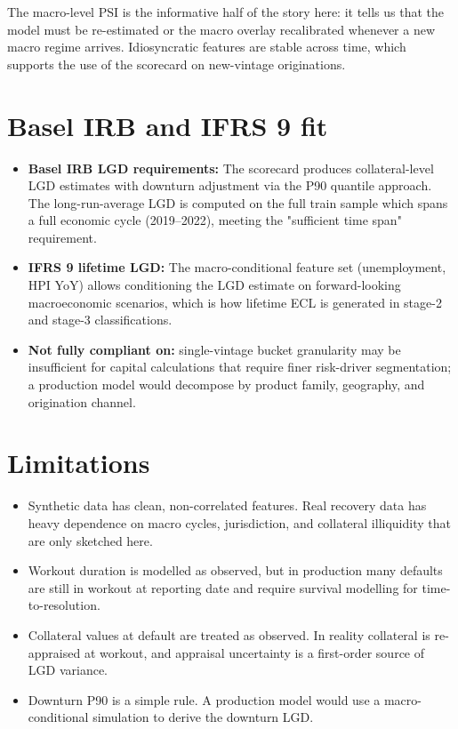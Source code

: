 \documentclass[a4paper,11pt]{article}
\begin{document}
The macro-level PSI is the informative half of the story here: it
tells us that the model must be re-estimated or the macro overlay
recalibrated whenever a new macro regime arrives. Idiosyncratic
features are stable across time, which supports the use of the
scorecard on new-vintage originations.

\section{Basel IRB and IFRS 9 fit}

\begin{itemize}
  \item \textbf{Basel IRB LGD requirements:} The scorecard produces
        collateral-level LGD estimates with downturn adjustment via
        the P90 quantile approach. The long-run-average LGD is
        computed on the full train sample which spans a full economic
        cycle (2019--2022), meeting the "sufficient time span"
        requirement.
  \item \textbf{IFRS 9 lifetime LGD:} The macro-conditional feature
        set (unemployment, HPI YoY) allows conditioning the LGD
        estimate on forward-looking macroeconomic scenarios, which is
        how lifetime ECL is generated in stage-2 and stage-3
        classifications.
  \item \textbf{Not fully compliant on:} single-vintage bucket
        granularity may be insufficient for capital calculations that
        require finer risk-driver segmentation; a production model
        would decompose by product family, geography, and origination
        channel.
\end{itemize}

\section{Limitations}

\begin{itemize}
  \item Synthetic data has clean, non-correlated features. Real
        recovery data has heavy dependence on macro cycles, jurisdiction,
        and collateral illiquidity that are only sketched here.
  \item Workout duration is modelled as observed, but in production
        many defaults are still in workout at reporting date and
        require survival modelling for time-to-resolution.
  \item Collateral values at default are treated as observed. In
        reality collateral is re-appraised at workout, and appraisal
        uncertainty is a first-order source of LGD variance.
  \item Downturn P90 is a simple rule. A production model would use a
        macro-conditional simulation to derive the downturn LGD.
\end{itemize}
\end{document}
